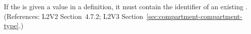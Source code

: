 If the   is given a value in a \Compartment
definition, it must contain the identifier of an existing \CompartmentType.
(References: L2V2 Section~4.7.2; L2V3 Section~\ref{sec:compartment-compartment-type}.)
